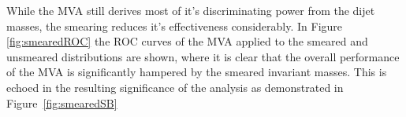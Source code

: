 While the MVA still derives most of it's discriminating power from the dijet masses, the smearing reduces it's effectiveness considerably. In Figure \ref{fig:smearedROC} the ROC curves of the MVA applied to the smeared and unsmeared distributions are shown, where it is clear that the overall performance of the MVA is significantly hampered by the smeared invariant masses. This is echoed in the resulting significance of the analysis as demonstrated in Figure~\ref{fig:smearedSB}
